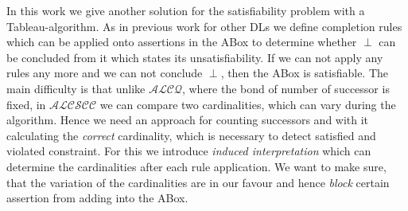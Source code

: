 \documentclass[a4paper,11pt]{scrartcl}
\theoremstyle{break}
\theoremstyle{definition}
\begin{document}
In this work we give another solution for the satisfiability problem with a Tableau-algorithm. As in previous work for other DLs we define completion rules which can be applied onto assertions in the ABox to determine whether $\perp$ can be concluded from it which states its unsatisfiability. If we can not apply any rules any more and we can not conclude $\perp$, then the ABox is satisfiable. The main difficulty is that unlike $\mathcal{ALCQ}$, where the bond of number of successor is fixed, in $\mathcal{ALCSCC}$ we can compare two cardinalities, which can vary during the algorithm. Hence we need an approach for counting successors and with it calculating the \textit{correct} cardinality, which is necessary to detect satisfied and violated constraint. For this we introduce \textit{induced interpretation} which can determine the cardinalities after each rule application. We want to make sure, that the variation of the cardinalities are in our favour and hence \textit{block} certain assertion from adding into the ABox.
\end{document}
